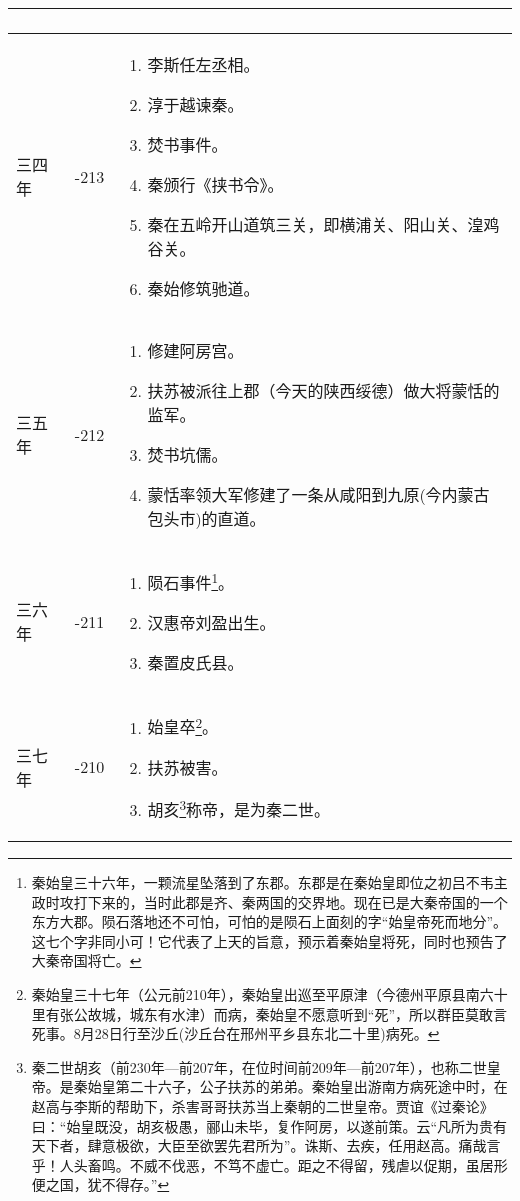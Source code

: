 \begin{longtable}{|>{\centering\scriptsize}m{2em}|>{\centering\small}m{2em}|>{\centering}m{8.3em}|}
\begin{enumerate}
  \end{enumerate} \tabularnewline\hline
  三四年 & -213 & \begin{enumerate}
    \tiny
  \item 李斯任左丞相。
  \item 淳于越谏秦。
  \item 焚书事件。
  \item 秦颁行《挟书令》。
  \item 秦在五岭开山道筑三关，即横浦关、阳山关、湟鸡谷关。
  \item 秦始修筑驰道。
  \end{enumerate} \tabularnewline\hline
  三五年 & -212 & \begin{enumerate}
    \tiny
  \item 修建阿房宫。
  \item 扶苏被派往上郡（今天的陕西绥德）做大将蒙恬的监军。
  \item 焚书坑儒。
  \item 蒙恬率领大军修建了一条从咸阳到九原(今内蒙古包头市)的直道。
  \end{enumerate} \tabularnewline\hline
  三六年 & -211 & \begin{enumerate}
    \tiny
  \item 陨石事件\footnote{秦始皇三十六年，一颗流星坠落到了东郡。东郡是在秦始皇即位之初吕不韦主政时攻打下来的，当时此郡是齐、秦两国的交界地。现在已是大秦帝国的一个东方大郡。陨石落地还不可怕，可怕的是陨石上面刻的字“始皇帝死而地分”。这七个字非同小可！它代表了上天的旨意，预示着秦始皇将死，同时也预告了大秦帝国将亡。}。
  \item 汉惠帝刘盈出生。
  \item 秦置皮氏县。
  \end{enumerate} \tabularnewline\hline
  三七年 & -210 & \begin{enumerate}
    \tiny
  \item 始皇卒\footnote{秦始皇三十七年（公元前210年），秦始皇出巡至平原津（今德州平原县南六十里有张公故城，城东有水津）而病，秦始皇不愿意听到“死”，所以群臣莫敢言死事。8月28日行至沙丘(沙丘台在邢州平乡县东北二十里)病死。}。
  \item 扶苏被害。
  \item 胡亥\footnote{秦二世胡亥（前230年—前207年，在位时间前209年—前207年），也称二世皇帝。是秦始皇第二十六子，公子扶苏的弟弟。秦始皇出游南方病死途中时，在赵高与李斯的帮助下，杀害哥哥扶苏当上秦朝的二世皇帝。贾谊《过秦论》曰：“始皇既没，胡亥极愚，郦山未毕，复作阿房，以遂前策。云“凡所为贵有天下者，肆意极欲，大臣至欲罢先君所为”。诛斯、去疾，任用赵高。痛哉言乎！人头畜鸣。不威不伐恶，不笃不虚亡。距之不得留，残虐以促期，虽居形便之国，犹不得存。”}称帝，是为秦二世。
  \end{enumerate} \tabularnewline
  \bottomrule
\end{longtable}


